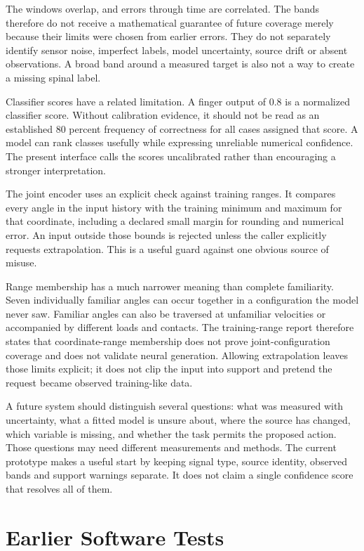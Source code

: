 The windows overlap, and errors through time are correlated. The bands therefore do not receive a mathematical guarantee of future coverage merely because their limits were chosen from earlier errors. They do not separately identify sensor noise, imperfect labels, model uncertainty, source drift or absent observations. A broad band around a measured target is also not a way to create a missing spinal label.

Classifier scores have a related limitation. A finger output of 0.8 is a normalized classifier score. Without calibration evidence, it should not be read as an established 80 percent frequency of correctness for all cases assigned that score. A model can rank classes usefully while expressing unreliable numerical confidence. The present interface calls the scores uncalibrated rather than encouraging a stronger interpretation.

The joint encoder uses an explicit check against training ranges. It compares every angle in the input history with the training minimum and maximum for that coordinate, including a declared small margin for rounding and numerical error. An input outside those bounds is rejected unless the caller explicitly requests extrapolation. This is a useful guard against one obvious source of misuse.

Range membership has a much narrower meaning than complete familiarity. Seven individually familiar angles can occur together in a configuration the model never saw. Familiar angles can also be traversed at unfamiliar velocities or accompanied by different loads and contacts. The training-range report therefore states that coordinate-range membership does not prove joint-configuration coverage and does not validate neural generation. Allowing extrapolation leaves those limits explicit; it does not clip the input into support and pretend the request became observed training-like data.

A future system should distinguish several questions: what was measured with uncertainty, what a fitted model is unsure about, where the source has changed, which variable is missing, and whether the task permits the proposed action. Those questions may need different measurements and methods. The current prototype makes a useful start by keeping signal type, source identity, observed bands and support warnings separate. It does not claim a single confidence score that resolves all of them.

\section{Earlier Software Tests}

